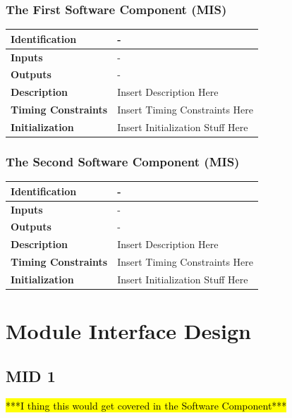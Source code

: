 \documentclass [11pt]{article}
\begin{document}
\subsubsection{The First Software Component (MIS)}
\begin{longtable}{| p{ } | p{ } | }\hline 
\textbf{Identification} & - \\ \hline
\textbf{Inputs} & - \\ \hline
\textbf{Outputs} & - \\ \hline
\textbf{Description} & Insert Description Here\\ \hline 
\textbf{Timing Constraints} & Insert Timing Constraints Here\\ \hline 
\textbf{Initialization} & Insert Initialization Stuff Here\\ \hline 
\end{longtable}

\subsubsection{The Second Software Component (MIS)}
\begin{longtable}{| p{ } | p{ } | }\hline 
\textbf{Identification} & - \\ \hline
\textbf{Inputs} & - \\ \hline
\textbf{Outputs} & - \\ \hline
\textbf{Description} & Insert Description Here\\ \hline 
\textbf{Timing Constraints} & Insert Timing Constraints Here\\ \hline 
\textbf{Initialization} & Insert Initialization Stuff Here\\ \hline 
\end{longtable}






\section{Module Interface Design}
\subsection {MID 1}

\hl{***I thing this would get covered in the Software Component***}
\end{document}

